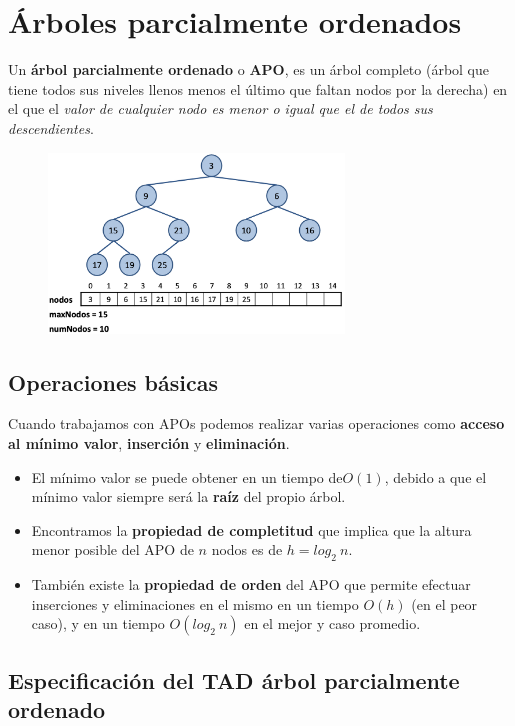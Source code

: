 \chapter{Árboles parcialmente ordenados}
Un \textbf{árbol parcialmente ordenado} o \textbf{APO}, es un árbol completo (árbol que tiene todos sus niveles llenos menos el último que faltan nodos por la derecha) en el que el \textit{valor de cualquier nodo es menor o igual que el de todos sus descendientes}. 
\begin{figure}[h]
  \begin{center}
    \includegraphics[width=0.7\textwidth]{assets/apo1.png}
  \end{center}
\end{figure}
\section{Operaciones básicas}
Cuando trabajamos con APOs podemos realizar varias operaciones como \textbf{acceso al mínimo valor}, \textbf{inserción} y \textbf{eliminación}.
\begin{itemize}
  \item El mínimo valor se puede obtener en un tiempo de\(O(1)\), debido a que el mínimo valor siempre será la \textbf{raíz} del propio árbol.
  \item Encontramos la \textbf{propiedad de completitud} que implica que la altura menor posible del APO de \(n\) nodos es de \(h = log_{2}\ n\).
  \item También existe la \textbf{propiedad de orden} del APO que permite efectuar inserciones y eliminaciones en el mismo en un tiempo \(O(h)\) (en el peor caso), y en un tiempo \(O(log_{2}\ n)\) en el mejor y caso promedio.
\end{itemize}

\section{Especificación del TAD árbol parcialmente ordenado}

